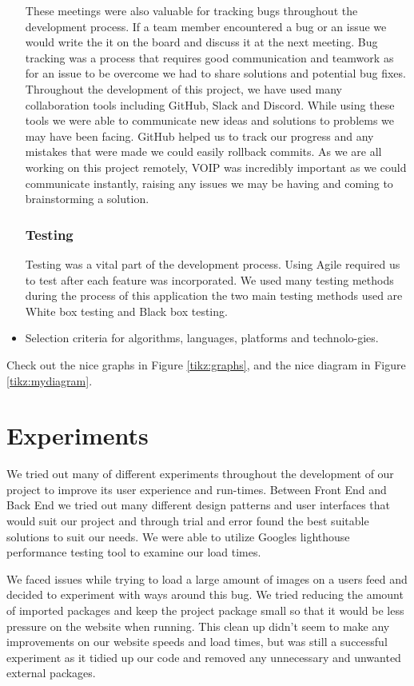 \begin{itemize}
These meetings were also valuable for tracking bugs throughout the development process. If a team member encountered a bug or an issue we would write the it on the board and discuss it at the next meeting. Bug tracking was a process that requires good communication and teamwork as for an issue to be overcome we had to share solutions and potential bug fixes. 
\newline
Throughout the development of this project, we have used many collaboration tools including GitHub, Slack and Discord. While using these tools we were able to communicate new ideas and solutions to problems we may have been facing. GitHub helped us to track our progress and any mistakes that were made we could easily rollback commits. As we are all working on this project remotely, VOIP was incredibly important as we could communicate instantly, raising any issues we may be having and coming to brainstorming a solution.
\subsection{Testing}
Testing was a vital part of the development process. Using Agile required us to test after each feature was incorporated. We used many testing methods during the process of this application the two main testing methods used are White box testing and Black box testing.
\item Selection criteria for algorithms, languages, platforms and technolo-gies.
\end{itemize}
Check out the nice graphs in Figure \ref{tikz:graphs}, and the nice diagram in Figure \ref{tikz:mydiagram}.

\chapter{Experiments}
We tried out many of different experiments throughout the development of our project to improve its user experience and run-times. Between Front End and Back End we tried out many different design patterns and user interfaces that would suit our project and through trial and error found the best suitable solutions to suit our needs. We were able to utilize Googles lighthouse performance testing tool to examine our load times.
\newline

We faced issues while trying to load a large amount of images on a users feed and decided to experiment with ways around this bug. We tried reducing the amount of imported packages and keep the project package small so that it would be less pressure on the website when running. This clean up didn't seem to make any improvements on our website speeds and load times, but was still a successful experiment as it tidied up our code and removed any unnecessary and unwanted external packages.
\newline

